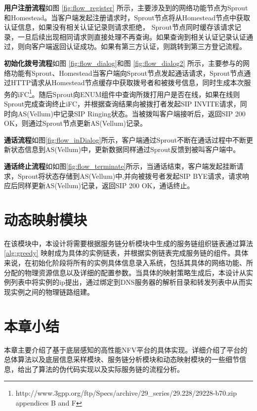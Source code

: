 \textbf{用户注册流程}如图 \ref{fig:flow_register} 所示，主要涉及到的网络功能节点为Sprout和Homestead。当客户端发起注册请求时，Sprout节点将从Homestead节点中获取认证信息，如果没有相关认证记录则请求拒绝， Sprout节点同时缓存该请求记录，一旦后续出现相同请求则直接处理不再查询。如果查询到相关认证记录认证通过，则向客户端返回认证成功。如果有第三方认证，则跳转到第三方登记流程。

\textbf{初始化拨号流程}如图 \ref{fig:flow_dialog}和图 \ref{fig:flow_dialog2} 所示，主要参与的网络功能有Sprout、Homestead当客户端向Sprout节点发起通话请求，Sprout节点通过HTTP请求从Homestead节点缓存中获取拨号者和被拨号信息，同时生成本次服务的iFC\footnote{http://www.3gpp.org/ftp/Specs/archive/29\_series/29.228/29228-b70.zip appendices B and F}。随后Sprout向ENUM组件中查询所拨打用户是否在线，如果在线则Sprout完成查询终止iFC，并根据查询结果向被拨打者发起SIP INVITE请求，同时向AS(Vellum)中记录SIP Ringing状态。当被拨叫客户端接听后，返回SIP 200 OK，则通过Sprout节点更新AS(Vellum)记录。

\textbf{通话流程}如图\ref{fig:flow_inDialog}所示，客户端通过Sprout不断在通话过程中不断更新状态信息到AS(Vellum)中，更新数据同样通过Sprout反馈到被叫客户端中。

\textbf{通话终止流程}如如图\ref{fig:flow_terminate}所示，当通话结束，客户端发起挂断请求，Sprout将状态存储到AS(Vellum)中,并向被拨号者发起SIP BYE请求，请求响应后同样更新AS(Vellum)记录，返回SIP 200 OK，通话终止。

\newpage
\section{动态映射模块}
在该模块中，本设计将需要根据服务链分析模块中生成的服务链组织链表通过算法 \ref{alg:greedy} 映射成为具体的实例链表，并根据实例链表完成服务链的组件。具体来说，在初始化阶段将所有的实例具体信息录入系统，包括其具体的网络功能、所分配的物理资源信息以及详细的配置参数。当具体的映射策略生成后，本设计从实例列表中将实例的ip提出，通过绑定到DNS服务器的解析目录和转发列表中从而实现实例之间的物理链路组建。


\section{本章小结}
本章主要介绍了基于底层感知的高性能NFV平台的具体实现。详细介绍了平台的总体算法以及底层信息采样模块、服务链分析模块和动态映射模块的一些细节信息，给出了算法的伪代码实现以及实际服务链的流程分析。